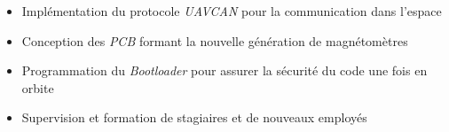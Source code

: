 {\vspace{-12pt}
\begin{itemize}
    \item Implémentation du protocole \textit{UAVCAN} pour la communication dans l'espace
    \item Conception des \textit{PCB} formant la nouvelle génération de magnétomètres
    \item Programmation du \textit{Bootloader} pour assurer la sécurité du code une fois en orbite
    \item Supervision et formation de stagiaires et de nouveaux employés
\end{itemize}}
    

